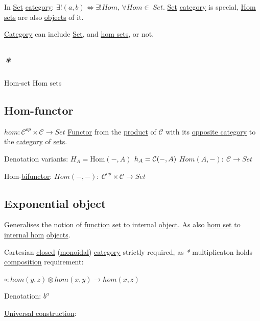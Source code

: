 \documentclass[a4paper,14pt,oneside]{book}
\begin{document}
In \hyperref[org28abdc9]{Set} \hyperref[org82baa03]{category}: \(\exists! (a, b) \iff \exists! Hom\), \(\forall Hom \in \ Set\). \hyperref[org28abdc9]{Set} \hyperref[org82baa03]{category} is special, \hyperref[org2b0d9df]{Hom sets} are also \hyperref[org88e24d2]{objects} of it.

\hyperref[org82baa03]{Category} can include \hyperref[org28abdc9]{Set}, and \hyperref[org2b0d9df]{hom sets}, or not.

\subsection{\emph{*}}
\label{sec:org014eb09}
\label{org13e52f9}Hom-set
\label{org2b0d9df}Hom sets

\subsection{\label{org6db70c6}Hom-functor}
\label{sec:orga3513e1}
\(hom:\mathcal{C}^{op} \times \mathcal{C} \to Set\)
\hyperref[orgdd3b6fb]{Functor} from the \hyperref[org917411a]{product} of \(\mathcal{C}\) with its \hyperref[org79c05d0]{opposite category} to the \hyperref[org82baa03]{category} of \hyperref[org8162ad1]{sets}.

Denotation variants:
\(H_A = \mathrm{Hom}(-, A)\)
\(h_A = {\cal \mathcal{C}}(-, A)\)
\(Hom(A,-): \ \mathcal{C} \to Set\)

Hom-\hyperref[orga80441c]{bifunctor}:
\(Hom(-,-): \ \mathcal{C}^{op} \times \mathcal{C} \to Set\)

\subsection{\label{orgab05585}Exponential object}
\label{sec:org04bfc46}
Generalises the notion of \hyperref[orgc39a15c]{function} \hyperref[org28abdc9]{set} to internal \hyperref[org8d6cd26]{object}.
As also \hyperref[orga768c9b]{hom set} to \hyperref[org17ab044]{internal hom} \hyperref[org88e24d2]{objects}.

Cartesian \hyperref[org2bfc801]{closed} (\hyperref[org914b93b]{monoidal}) \hyperref[org82baa03]{category} strictly required, as \emph{*} multiplicaton holds \hyperref[orgc4a089b]{composition} requirement: 

\(\circ:hom(y,z) \otimes hom(x,y) \to hom(x,z)\)

Denotation:
\(b^{a}\)

\hyperref[org1dce819]{Universal construction}:
\end{document}
